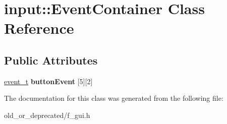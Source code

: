 \hypertarget{classinput_1_1_event_container}{}\section{input\+::Event\+Container Class Reference}
\label{classinput_1_1_event_container}
\subsection*{Public Attributes}
\begin{DoxyCompactItemize}
\item 
\mbox{\label{classinput_1_1_event_container_a8fb7e12bb3949668383a3af5e16073cc}} 
\mbox{\hyperlink{structinput_1_1event__s}{event\+\_\+t}} {\bfseries button\+Event} \mbox{[}5\mbox{]}\mbox{[}2\mbox{]}
\end{DoxyCompactItemize}


The documentation for this class was generated from the following file\+:\begin{DoxyCompactItemize}
\item 
old\+\_\+or\+\_\+deprecated/f\+\_\+gui.\+h\end{DoxyCompactItemize}
